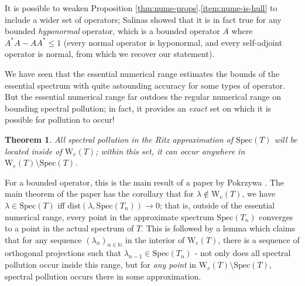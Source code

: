 \documentclass{article}
\newcommand{\Num}{\text{W}}
\newcommand{\Spec}{\text{Spec}}
\newtheorem{theorem}[proposition]{Theorem}
\begin{document}
It is possible to weaken Proposition \ref{thm:nume-props}.\ref{item:nume-is-hull} to include a wider set of operators; Salinas \parencite{salinassomethingsomething} showed that it is in fact true for any bounded \emph{hyponormal} operator, which is a bounded operator $A$ where $A^*A - AA^* \leq 1$ (every normal operator is hyponormal, and every self-adjoint operator is normal, from which we recover our statement).

We have seen that the essential numerical range estimates the bounds of the essential spectrum with quite astounding accuracy for some types of
operator. But the essential numerical range far outdoes the regular numerical range on bounding spectral pollution; in fact, it provides an \emph{exact}
set on which it is possible for pollution to occur! 

\begin{theorem}
All spectral pollution in the Ritz approximation of $\Spec(T)$ will be located inside of $\Num_e(T)$; within this set, it can occur anywhere in $\Num_e(T) \setminus \Spec(T)$.
\end{theorem}

For a bounded operator, this is the main result of a paper by Pokrzywa \parencite{pokrzywa1979method}. The main theorem of the paper has the
corollary that for $\lambda \notin \Num_e(T)$, we have $\lambda \in \Spec(T)$ iff $\text{dist}(\lambda, \Spec(T_n)) \rightarrow 0$; that is, outside of the
essential numerical range, every point in the approximate spectrum $\Spec(T_n)$ converges to a point in the actual spectrum of $T$. This is followed by
a lemma which claims that for any sequence $(\lambda_n)_{n \in \mathbb{N}}$ in the interior of $\Num_e(T)$, there is a sequence of orthogonal projections such that $\lambda_{n-1} \in \Spec(T_n)$ - not only does all spectral pollution occur inside this range, but for \emph{any point} in 
$\Num_e(T) \setminus \Spec(T)$, spectral pollution occurs there in some approximation.


\printbibliography
\end{document}
